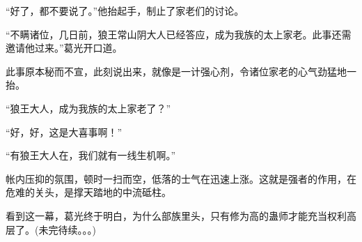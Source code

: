 \begin{this_body}
“好了，都不要说了。”他抬起手，制止了家老们的讨论。

“不瞒诸位，几日前，狼王常山阴大人已经答应，成为我族的太上家老。此事还需邀请他过来。”葛光开口道。

此事原本秘而不宣，此刻说出来，就像是一计强心剂，令诸位家老的心气劲猛地一抬。

“狼王大人，成为我族的太上家老了？”

“好，好，这是大喜事啊！”

“有狼王大人在，我们就有一线生机啊。”

帐内压抑的氛围，顿时一扫而空，低落的士气在迅速上涨。这就是强者的作用，在危难的关头，是撑天踏地的中流砥柱。

看到这一幕，葛光终于明白，为什么部族里头，只有修为高的蛊师才能充当权利高层了。(未完待续。。。)

\end{this_body}

